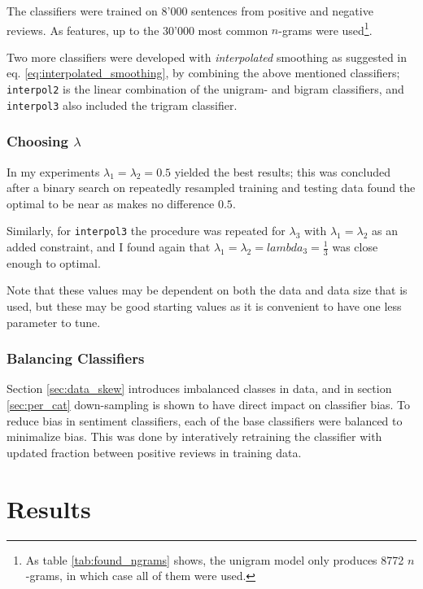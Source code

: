 \documentclass[a4paper,11pt]{kth-mag}
\newcommand{\ngram}{$n$-gram}
\begin{document}
The classifiers were trained on 8'000 sentences from positive and negative reviews.
As features, up to the 30'000 most common \ngram s were used\footnote{As table
\ref{tab:found_ngrams} shows, the unigram model only produces 8772 \ngram s,
in which case all of them were used.}.


Two more classifiers were developed with \emph{interpolated} smoothing as suggested in eq.
\ref{eq:interpolated_smoothing}, by combining the above mentioned classifiers;
\texttt{interpol2} is the linear combination of the unigram- and bigram classifiers, and \texttt{interpol3}
also included the trigram classifier.

\subsubsection{Choosing $\lambda$}
In my experiments $\lambda_1 = \lambda_2 = 0.5$ yielded the best results; this was concluded after a binary search
on repeatedly resampled training and testing data found the optimal to be near as makes no difference $0.5$.

Similarly, for \texttt{interpol3} the procedure was repeated for $\lambda_3$ with $\lambda_1 = \lambda_2$ as an added
constraint, and I found again that $\lambda_1 = \lambda_2 = lambda_3 = \frac{1}{3}$ was close enough to optimal.

Note that these values may be dependent on both the data and data size that is used, but these may be good starting
values as it is convenient to have one less parameter to tune.


\subsubsection{Balancing Classifiers}
\label{subsec:sent_balance}
Section \ref{sec:data_skew} introduces imbalanced classes in data, and in section \ref{sec:per_cat} down-sampling is shown to have direct impact on classifier bias. To reduce bias in sentiment classifiers, each of the base classifiers
were balanced to minimalize bias. This was done by interatively retraining the classifier with updated fraction between positive reviews in training data.


\pagebreak
\section{Results}
\end{document}
